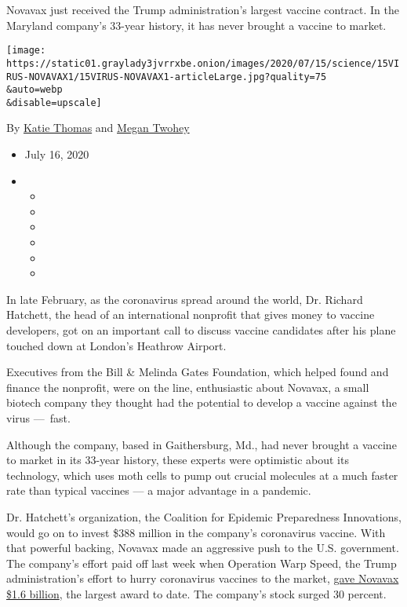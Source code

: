 Novavax just received the Trump administration's largest vaccine
contract. In the Maryland company's 33-year history, it has never
brought a vaccine to market.

\texttt{[image: https://static01.graylady3jvrrxbe.onion/images/2020/07/15/science/15VIRUS-NOVAVAX1/15VIRUS-NOVAVAX1-articleLarge.jpg?quality=75\\\&auto=webp\\\&disable=upscale]}

By \href{https://www.nytimes3xbfgragh.onion/by/katie-thomas}{Katie
Thomas} and
\href{https://www.nytimes3xbfgragh.onion/by/megan-twohey}{Megan Twohey}

\begin{itemize}
\item
  July 16, 2020
\item
  \begin{itemize}
  \item
  \item
  \item
  \item
  \item
  \item
  \end{itemize}
\end{itemize}

In late February, as the coronavirus spread around the world, Dr.
Richard Hatchett, the head of an international nonprofit that gives
money to vaccine developers, got on an important call to discuss vaccine
candidates after his plane touched down at London's Heathrow Airport.

Executives from the Bill \& Melinda Gates Foundation, which helped found
and finance the nonprofit, were on the line, enthusiastic about Novavax,
a small biotech company they thought had the potential to develop a
vaccine against the virus ---~fast.

Although the company, based in Gaithersburg, Md., had never brought a
vaccine to market in its 33-year history, these experts were optimistic
about its technology, which uses moth cells to pump out crucial
molecules at a much faster rate than typical vaccines --- a major
advantage in a pandemic.

Dr. Hatchett's organization, the Coalition for Epidemic Preparedness
Innovations, would go on to invest \$388 million in the company's
coronavirus vaccine. With that powerful backing, Novavax made an
aggressive push to the U.S. government. The company's effort paid off
last week when Operation Warp Speed, the Trump administration's effort
to hurry coronavirus vaccines to the market,
\href{https://www.nytimes3xbfgragh.onion/2020/07/07/health/novavax-coronavirus-vaccine-warp-speed.html}{gave
Novavax \$1.6 billion}, the largest award to date. The company's stock
surged 30 percent.

